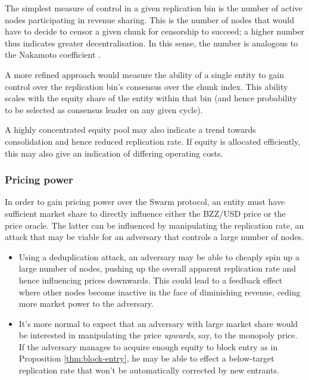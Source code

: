The simplest measure of control in a given replication bin is the number of active nodes participating in revenue sharing.
%
This is the number of nodes that would have to decide to censor a given chunk for censorship to succeed; a higher number thus indicates greater decentralisation.
%
In this sense, the number is analogous to the Nakamoto coefficient \cite{srinivasan2017quantifying}.

A more refined approach would measure the ability of a single entity to gain control over the replication bin's consensus over the chunk index.
%
This ability scales with the equity share of the entity within that bin (and hence probability to be selected as consensus leader on any given cycle).

A highly concentrated equity pool may also indicate a trend towards consolidation and hence reduced replication rate. 
%
If equity is allocated efficiently, this may also give an indication of differing operating costs.

\subsubsection{Pricing power}
%
In order to gain pricing power over the Swarm protocol, an entity must have sufficient market share to directly influence either the BZZ/USD price or the price oracle.
%
The latter can be influenced by manipulating the replication rate, an attack that may be viable for an adversary that controls a large number of nodes.

\begin{itemize}
  \item
    Using a deduplication attack, an adversary may be able to cheaply spin up a large number of nodes, pushing up the overall apparent replication rate and hence influencing prices downwards.
    This could lead to a feedback effect where other nodes become inactive in the face of diminishing revenue, ceding more market power to the adversary.

  \item
    It's more normal to expect that an adversary with large market share would be interested in manipulating the price \emph{upwards}, say, to the monopoly price.
    If the adversary manages to acquire enough equity to block entry as in Proposition \ref{thm:block-entry}, he may be able to effect a below-target replication rate that won't be automatically corrected by new entrants.

\end{itemize}



